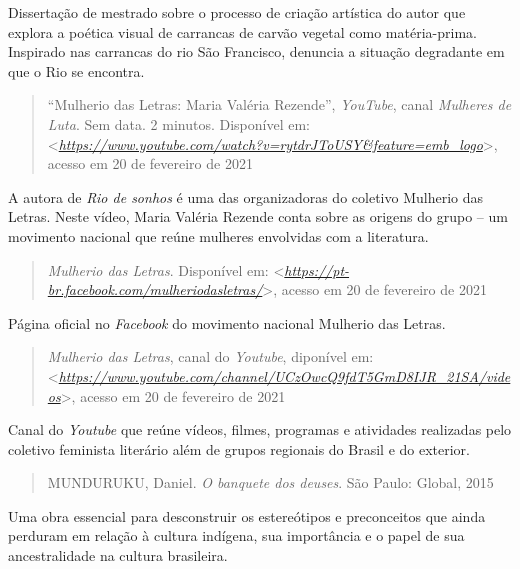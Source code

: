 \documentclass{extrarticle}
\begin{document}
    Dissertação de mestrado sobre o processo de criação artística do
    autor que explora a poética visual de carrancas de carvão vegetal
    como matéria-prima. Inspirado nas carrancas do rio São Francisco,
    denuncia a situação degradante em que o Rio se encontra.

    \begin{quote}
    ``Mulherio das Letras: Maria Valéria Rezende'', \emph{YouTube},
    canal \emph{Mulheres de Luta}. Sem data. 2 minutos. Disponível em:
    \textless{}\href{https://www.youtube.com/watch?v=rytdrJToUSY\&feature=emb_logo}{\emph{https://www.youtube.com/watch?v=rytdrJToUSY\&feature=emb\_logo}}\textgreater{},
    acesso em 20 de fevereiro de 2021
    \end{quote}

    A autora de \emph{Rio de sonhos} é uma das organizadoras do coletivo
    Mulherio das Letras. Neste vídeo, Maria Valéria Rezende conta sobre
    as origens do grupo -- um movimento nacional que reúne mulheres
    envolvidas com a literatura.

    \begin{quote}
    \emph{Mulherio das Letras}. Disponível em:
    \textless{}\href{https://pt-br.facebook.com/mulheriodasletras/}{\emph{https://pt-br.facebook.com/mulheriodasletras/}}\textgreater{},
    acesso em 20 de fevereiro de 2021
    \end{quote}

    Página oficial no \emph{Facebook} do movimento nacional Mulherio das
    Letras.

    \begin{quote}
    \emph{Mulherio das Letras}, canal do \emph{Youtube}, diponível em:
    \textless{}\href{https://www.youtube.com/channel/UCzOwcQ9fdT5GmD8IJR_21SA/videos}{\emph{https://www.youtube.com/channel/UCzOwcQ9fdT5GmD8IJR\_21SA/videos}}\textgreater{},
    acesso em 20 de fevereiro de 2021
    \end{quote}

    Canal do \emph{Youtube} que reúne vídeos, filmes, programas e
    atividades realizadas pelo coletivo feminista literário além de
    grupos regionais do Brasil e do exterior.

    \begin{quote}
    MUNDURUKU, Daniel. \emph{O banquete dos deuses}. São Paulo: Global,
    2015
    \end{quote}

    Uma obra essencial para desconstruir os estereótipos e preconceitos
    que ainda perduram em relação à cultura indígena, sua importância e
    o papel de sua ancestralidade na cultura brasileira.
\end{document}
